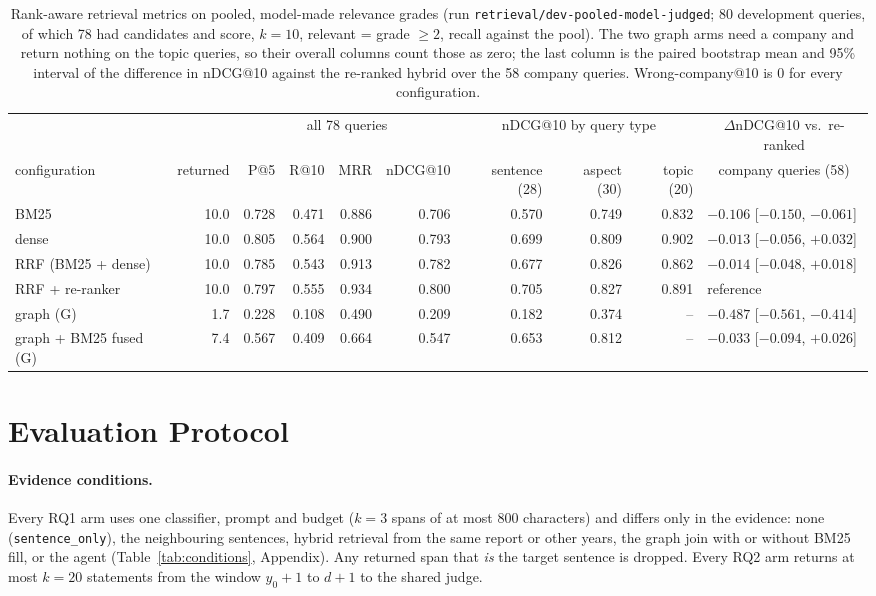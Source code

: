 \documentclass[11pt]{article}
\newcommand{\cond}[1]{\texttt{#1}}
\newcommand{\run}[1]{\nolinkurl{#1}}
\begin{document}
\begin{table}[t]
\centering\scriptsize
\setlength{\tabcolsep}{3.5pt}
\begin{tabular}{@{}lrrrrrrrrl@{}}
\toprule
 & & \multicolumn{4}{c}{all 78 queries} & \multicolumn{3}{c}{nDCG@10 by query type} & \multicolumn{1}{c}{$\Delta$nDCG@10 vs.\ re-ranked} \\
\cmidrule(lr){3-6}\cmidrule(lr){7-9}\cmidrule(l){10-10}
configuration & returned & P@5 & R@10 & MRR & nDCG@10 & sentence (28) & aspect (30) & topic (20) & \multicolumn{1}{c}{company queries (58)} \\
\midrule
BM25 & 10.0 & 0.728 & 0.471 & 0.886 & 0.706 & 0.570 & 0.749 & 0.832 & $-0.106$ [$-0.150$, $-0.061$] \\
dense & 10.0 & 0.805 & 0.564 & 0.900 & 0.793 & 0.699 & 0.809 & 0.902 & $-0.013$ [$-0.056$, $+0.032$] \\
RRF (BM25 + dense) & 10.0 & 0.785 & 0.543 & 0.913 & 0.782 & 0.677 & 0.826 & 0.862 & $-0.014$ [$-0.048$, $+0.018$] \\
RRF + re-ranker & 10.0 & 0.797 & 0.555 & 0.934 & 0.800 & 0.705 & 0.827 & 0.891 & reference \\
graph (G) & 1.7 & 0.228 & 0.108 & 0.490 & 0.209 & 0.182 & 0.374 & -- & $-0.487$ [$-0.561$, $-0.414$] \\
graph + BM25 fused (G) & 7.4 & 0.567 & 0.409 & 0.664 & 0.547 & 0.653 & 0.812 & -- & $-0.033$ [$-0.094$, $+0.026$] \\
\bottomrule
\end{tabular}
\caption{Rank-aware retrieval metrics on pooled, model-made relevance grades (run \run{retrieval/dev-pooled-model-judged}; 80 development queries, of which 78 had candidates and score, $k = 10$, relevant = grade $\ge 2$, recall against the pool). The two graph arms need a company and return nothing on the topic queries, so their overall columns count those as zero; the last column is the paired bootstrap mean and 95\% interval of the difference in nDCG@10 against the re-ranked hybrid over the 58 company queries. Wrong-company@10 is 0 for every configuration.}
\label{tab:retrieval}
\end{table}

\section{Evaluation Protocol}
\label{sec:metrics}

\paragraph{Evidence conditions.}
\label{sec:conditions}
Every RQ1 arm uses one classifier, prompt and budget ($k = 3$ spans of at most 800 characters) and differs only in the evidence: none (\cond{sentence\_only}), the neighbouring sentences, hybrid retrieval from the same report or other years, the graph join with or without BM25 fill, or the agent (Table~\ref{tab:conditions}, Appendix). Any returned span that \emph{is} the target sentence is dropped. Every RQ2 arm returns at most $k = 20$ statements from the window $y_0{+}1$ to $d{+}1$ to the shared judge.
\end{document}
